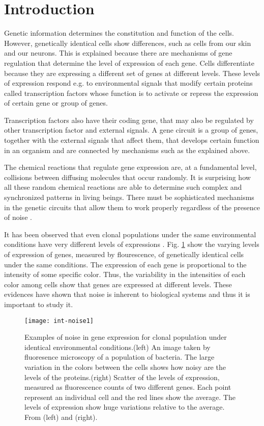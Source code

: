 \chapter*{Introduction}
\renewcommand{\thefigure}{I.\arabic{figure}}

Genetic information determines the constitution and function of the cells. However, genetically identical cells show differences, such as cells from our skin and our neurons. This is explained because there are mechanisms of gene regulation that determine the level of expression of each gene. Cells differentiate because they are expressing a different set of genes at different levels. These levels of expression respond e.g. to environmental signals that modify certain proteins called transcription factors whose function is to activate or repress the expression of certain gene or group of genes.

Transcription factors also have their coding gene, that may also be regulated by other transcription factor and external signals. A gene circuit is a group of genes, together with the external signals that affect them, that develops certain function in an organism and are connected by mechanisms such as the explained above.

The chemical reactions that regulate gene expression are, at a fundamental level, collisions between diffusing molecules that occur randomly. It is surprising how all these random chemical reactions are able to determine such complex and synchronized patterns in living beings. There must be sophisticated mechanisms in the genetic circuits that allow them to work properly regardless of the presence of noise \cite{kaern05}.

It has been observed that even clonal populations under the same environmental conditions have very different levels of expressions \cite{elowitz02} \cite{pedraza05}. Fig. \ref{fig:int-noise1} show the varying levels of expression of genes, measured by flourescence, of genetically identical cells under the same conditions. The expression of each gene is proportional to the intensity of some specific color. Thus, the variability in the intensities of each color among cells show that genes are expressed at different levels. These evidences have shown that noise is inherent to biological systems and thus it is important to study it.

\begin{figure}[H]
  \centering
  \texttt{[image: int-noise1]}
  \caption[Examples of noise in gene expression]{\label{fig:int-noise1}Examples of noise in gene expression for clonal population under identical environmental conditions.(left) An image taken by fluoresence microscopy of a population of bacteria. The large variation in the colors between the cells shows how noisy are the levels of the proteins.(right) Scatter of the levels of expression, measured as fluorescence counts of two different genes. Each point represent an individual cell and the red lines show the average. The levels of expression show huge variations relative to the average. From \cite{elowitz02} (left) and \cite{pedraza05} (right).}
\end{figure}

